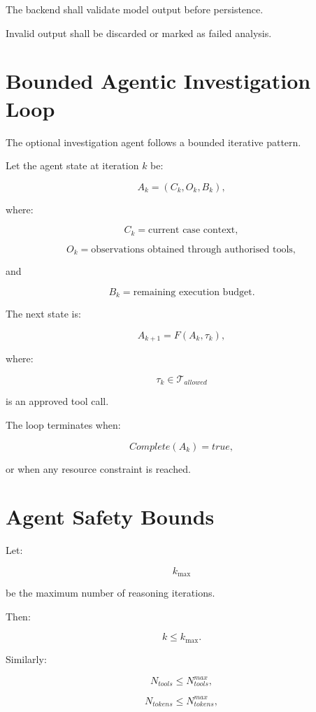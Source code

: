 \documentclass[11pt,a4paper]{article}
\begin{document}
The backend shall validate model output before persistence.

Invalid output shall be discarded or marked as failed analysis.

\section{Bounded Agentic Investigation Loop}

The optional investigation agent follows a bounded iterative pattern.

Let the agent state at iteration \(k\) be:

\[
A_k
=
(C_k,O_k,B_k),
\]

where:

\[
C_k = \text{current case context},
\]

\[
O_k = \text{observations obtained through authorised tools},
\]

and

\[
B_k = \text{remaining execution budget}.
\]

The next state is:

\[
A_{k+1}
=
F(A_k,\tau_k),
\]

where:

\[
\tau_k
\in
\mathcal{T}_{allowed}
\]

is an approved tool call.

The loop terminates when:

\[
Complete(A_k)=true,
\]

or when any resource constraint is reached.

\section{Agent Safety Bounds}

Let:

\[
k_{\max}
\]

be the maximum number of reasoning iterations.

Then:

\[
k\leq k_{\max}.
\]

Similarly:

\[
N_{tools}\leq N_{tools}^{max},
\]

\[
N_{tokens}\leq N_{tokens}^{max},
\]
\end{document}
